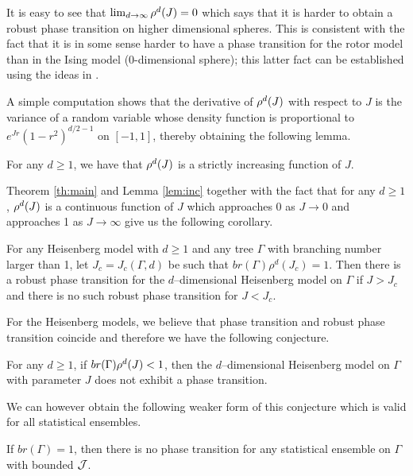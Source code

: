 It is easy to see that $\lim_{d\to\infty} \rho^d(J)=0$ which says that 
it is harder to obtain a robust phase transition on higher dimensional
spheres. This is consistent with the fact that it is in some sense harder to
have a phase transition for the rotor model than in the Ising 
model (0-dimensional sphere); this
latter fact can be established using the ideas in \cite{PS}.

A simple computation shows that the derivative of $\rho^d(J)$ with respect to
$J$ is the variance of a random variable whose density function is 
proportional to $e^{Jr}(1-r^2)^{d/2 -1}$ on $[-1,1]$, thereby obtaining
the following lemma.
\begin{lem} \label{lem:inc}
For any $d\ge 1$,
we have that $\rho^d(J)$ is a strictly increasing function of $J$.
\end{lem}

Theorem \ref{th:main} and Lemma \ref{lem:inc} together with the
fact that for any $d\ge 1$,
$\rho^d(J)$ is a continuous function of $J$ which approaches
0 as $J\to 0$ and approaches 1 as $J\to \infty$ give us
the following corollary.

\begin{cor} \label{cor:critical}
For any Heisenberg model with $d\ge 1$ and any
tree $\Gamma$ with branching number larger than 1, let $J_c=J_c(\Gamma, d)$
be such that $\textstyle{br}(\Gamma) \rho^d(J_c)=1$. Then
there is a robust phase transition for the $d$--dimensional Heisenberg 
model on $\Gamma$ if $J> J_c$ and
there is no such robust phase transition for $J< J_c$.
\end{cor}

For the Heisenberg models, we believe that phase transition and
robust phase transition coincide and therefore we have the
following conjecture.

\begin{conj} \label{conj:PS}
For any $d\ge 1$, if $\textstyle {br} (\Gamma) \rho^d(J) <1$, 
then the $d$--dimensional Heisenberg 
model on $\Gamma$ with parameter $J$ does not exhibit a phase 
transition.
\end{conj}

We can however obtain the following weaker form of this conjecture which is
valid for all statistical ensembles.

\begin{th} \label{th:0hd}
If $\textstyle {br}  (\Gamma) = 1$, then there is no phase transition
for any statistical ensemble on $\Gamma$ with bounded ${\cal J}$.
\end{th}

